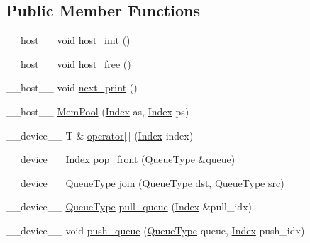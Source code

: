 \subsection*{Public Member Functions}
\begin{DoxyCompactItemize}
\item 
\-\_\-\-\_\-host\-\_\-\-\_\- void \hyperlink{structutil_1_1MemPool_ab13d5502d219c3381994e75dd4d84ce1}{host\-\_\-init} ()
\item 
\-\_\-\-\_\-host\-\_\-\-\_\- void \hyperlink{structutil_1_1MemPool_a855f983e0f3d6eac87cd8c11e9b3142d}{host\-\_\-free} ()
\item 
\-\_\-\-\_\-host\-\_\-\-\_\- void \hyperlink{structutil_1_1MemPool_abc51b8cea537c2acf9ebf79778a483a1}{next\-\_\-print} ()
\item 
\-\_\-\-\_\-host\-\_\-\-\_\- \hyperlink{structutil_1_1MemPool_a48e67362c8468f007d394fefe0399219}{Mem\-Pool} (\hyperlink{structutil_1_1MemPool_abad76ce984ee05501d88426b5641e5c2}{Index} as, \hyperlink{structutil_1_1MemPool_abad76ce984ee05501d88426b5641e5c2}{Index} ps)
\item 
\-\_\-\-\_\-device\-\_\-\-\_\- T \& \hyperlink{structutil_1_1MemPool_a372f2dd762307f6bb9478c365dfc0e9c}{operator\mbox{[}$\,$\mbox{]}} (\hyperlink{structutil_1_1MemPool_abad76ce984ee05501d88426b5641e5c2}{Index} index)
\item 
\-\_\-\-\_\-device\-\_\-\-\_\- \hyperlink{structutil_1_1MemPool_abad76ce984ee05501d88426b5641e5c2}{Index} \hyperlink{structutil_1_1MemPool_ace7d680ad5232d3a4fddafd10c8655c3}{pop\-\_\-front} (\hyperlink{structutil_1_1MemPool_a354adf83f470881d3839a19f9589aad9}{Queue\-Type} \&queue)
\item 
\-\_\-\-\_\-device\-\_\-\-\_\- \hyperlink{structutil_1_1MemPool_a354adf83f470881d3839a19f9589aad9}{Queue\-Type} \hyperlink{structutil_1_1MemPool_a30d4d43210f5e810f597af9d758fa72a}{join} (\hyperlink{structutil_1_1MemPool_a354adf83f470881d3839a19f9589aad9}{Queue\-Type} dst, \hyperlink{structutil_1_1MemPool_a354adf83f470881d3839a19f9589aad9}{Queue\-Type} src)
\item 
\-\_\-\-\_\-device\-\_\-\-\_\- \hyperlink{structutil_1_1MemPool_a354adf83f470881d3839a19f9589aad9}{Queue\-Type} \hyperlink{structutil_1_1MemPool_a63c0c9b347a66f138c0a68d93c5c5511}{pull\-\_\-queue} (\hyperlink{structutil_1_1MemPool_abad76ce984ee05501d88426b5641e5c2}{Index} \&pull\-\_\-idx)
\item 
\-\_\-\-\_\-device\-\_\-\-\_\- void \hyperlink{structutil_1_1MemPool_ab399152d336ca2fc75be7f0d0b39e206}{push\-\_\-queue} (\hyperlink{structutil_1_1MemPool_a354adf83f470881d3839a19f9589aad9}{Queue\-Type} queue, \hyperlink{structutil_1_1MemPool_abad76ce984ee05501d88426b5641e5c2}{Index} push\-\_\-idx)

\end{DoxyCompactItemize}
